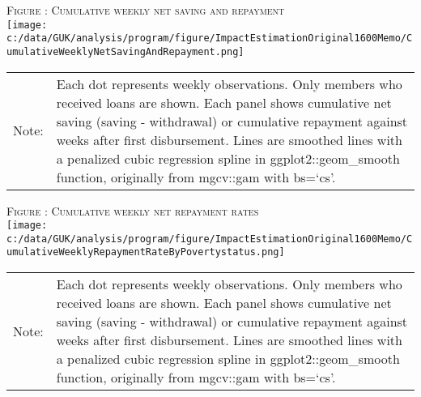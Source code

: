 \hfil\textsc{\footnotesize Figure \thefigure: Cumulative weekly net saving and repayment\label{fig weeklysavingrepay}}\\
\hfil\texttt{[image: c:/data/GUK/analysis/program/figure/ImpactEstimationOriginal1600Memo/CumulativeWeeklyNetSavingAndRepayment.png]}\\
\renewcommand{\arraystretch}{1}
\hfil\begin{tabular}{>{\hfill\scriptsize}p{1cm}<{}>{\scriptsize}p{12cm}<{\hfill}}
Note:& Each dot represents weekly observations. Only members who received loans are shown. Each panel shows cumulative net saving (saving - withdrawal) or cumulative repayment against weeks after first disbursement. Lines are smoothed lines with a penalized cubic regression spline in \textsf{ggplot2::geom\_smooth} function, originally from \textsf{mgcv::gam} with \textsf{bs=`cs'}. \\[-1ex]
\end{tabular}


\hfil\textsc{\footnotesize Figure \thefigure: Cumulative weekly net repayment rates\label{fig weeklysavingrepayrate}}\\
\hfil\texttt{[image: c:/data/GUK/analysis/program/figure/ImpactEstimationOriginal1600Memo/CumulativeWeeklyRepaymentRateByPovertystatus.png]}\\
\renewcommand{\arraystretch}{1}
\hfil\begin{tabular}{>{\hfill\scriptsize}p{1cm}<{}>{\scriptsize}p{12cm}<{\hfill}}
Note:& Each dot represents weekly observations. Only members who received loans are shown. Each panel shows cumulative net saving (saving - withdrawal) or cumulative repayment against weeks after first disbursement. Lines are smoothed lines with a penalized cubic regression spline in \textsf{ggplot2::geom\_smooth} function, originally from \textsf{mgcv::gam} with \textsf{bs=`cs'}. \\[-1ex]
\end{tabular}

















